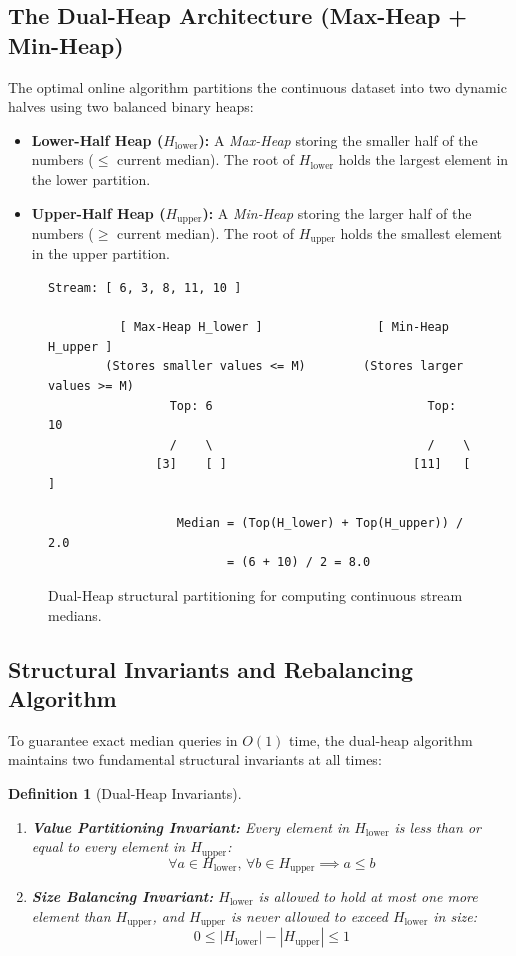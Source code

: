 \documentclass[10pt,journal,compsoc,onecolumn]{IEEEtran}
\newtheorem{definition}[theorem]{Definition}
\begin{document}
\subsection{The Dual-Heap Architecture (Max-Heap + Min-Heap)}

The optimal online algorithm partitions the continuous dataset into two dynamic halves using two balanced binary heaps:
\begin{itemize}
    \item \textbf{Lower-Half Heap ($H_{\text{lower}}$):} A \emph{Max-Heap} storing the smaller half of the numbers ($\le$ current median). The root of $H_{\text{lower}}$ holds the largest element in the lower partition.
    \item \textbf{Upper-Half Heap ($H_{\text{upper}}$):} A \emph{Min-Heap} storing the larger half of the numbers ($\ge$ current median). The root of $H_{\text{upper}}$ holds the smallest element in the upper partition.
\end{itemize}

\begin{figure}[htbp]
\centering
\begin{verbatim}
Stream: [ 6, 3, 8, 11, 10 ]

          [ Max-Heap H_lower ]                [ Min-Heap H_upper ]
        (Stores smaller values <= M)        (Stores larger values >= M)
                 Top: 6                              Top: 10
                 /    \                              /    \
               [3]    [ ]                          [11]   [ ]

                  Median = (Top(H_lower) + Top(H_upper)) / 2.0
                         = (6 + 10) / 2 = 8.0
\end{verbatim}
\caption{Dual-Heap structural partitioning for computing continuous stream medians.}
\label{fig:dual-heap-diagram}
\end{figure}

\subsection{Structural Invariants and Rebalancing Algorithm}

To guarantee exact median queries in $O(1)$ time, the dual-heap algorithm maintains two fundamental structural invariants at all times:

\begin{definition}[Dual-Heap Invariants]
\begin{enumerate}
    \item \textbf{Value Partitioning Invariant:} Every element in $H_{\text{lower}}$ is less than or equal to every element in $H_{\text{upper}}$:
    \[
    \forall a \in H_{\text{lower}}, \, \forall b \in H_{\text{upper}} \implies a \le b
    \]
    \item \textbf{Size Balancing Invariant:} $H_{\text{lower}}$ is allowed to hold at most one more element than $H_{\text{upper}}$, and $H_{\text{upper}}$ is never allowed to exceed $H_{\text{lower}}$ in size:
    \[
    0 \le |H_{\text{lower}}| - |H_{\text{upper}}| \le 1
    \]
\end{enumerate}
\end{definition}
\end{document}
